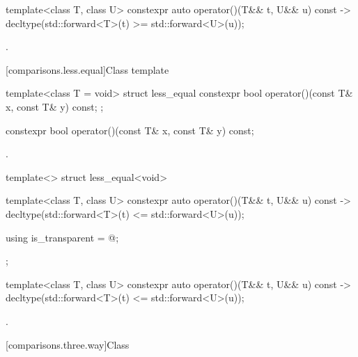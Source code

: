 %
\begin{itemdecl}
template<class T, class U> constexpr auto operator()(T&& t, U&& u) const
    -> decltype(std::forward<T>(t) >= std::forward<U>(u));
\end{itemdecl}

\begin{itemdescr}
\pnum
\returns
{}.
\end{itemdescr}

[comparisons.less.equal]{Class template }

\begin{indexed}{}
\begin{itemdecl}
template<class T = void> struct less_equal {
  constexpr bool operator()(const T& x, const T& y) const;
};
\end{itemdecl}
\end{indexed}

%
\begin{itemdecl}
constexpr bool operator()(const T& x, const T& y) const;
\end{itemdecl}

\begin{itemdescr}
\pnum
\returns
{}.
\end{itemdescr}

%
\begin{itemdecl}
template<> struct less_equal<void> {
  template<class T, class U> constexpr auto operator()(T&& t, U&& u) const
    -> decltype(std::forward<T>(t) <= std::forward<U>(u));

  using is_transparent = @\unspec@;
};
\end{itemdecl}

%
\begin{itemdecl}
template<class T, class U> constexpr auto operator()(T&& t, U&& u) const
    -> decltype(std::forward<T>(t) <= std::forward<U>(u));
\end{itemdecl}

\begin{itemdescr}
\pnum
\returns
{}.
\end{itemdescr}

[comparisons.three.way]{Class }

